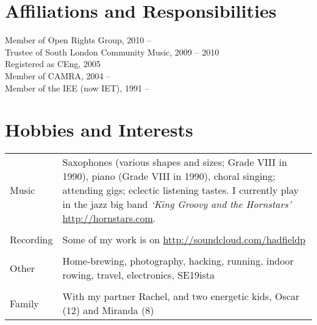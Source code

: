 \documentclass[line]{resume}
\begin{document}
\begin{resume}
    \section{\mysidestyle Affiliations and Responsibilities}

    Member of Open Rights Group, 2010 --                                                              \vspace{0.5mm}\\%
    Trustee of South London Community Music, 2009 -- 2010                                             \vspace{0.5mm}\\%
    Registered as CEng, 2005                                                                          \vspace{0.5mm}\\%
    Member of CAMRA, 2004 --                                                                          \vspace{0.5mm}\\%
    Member of the IEE (now IET), 1991 --

    \section{\mysidestyle Hobbies and Interests}
    \vspace{1.5mm}
    \begin{table}[ht]
        \begin{tabular}{p{2cm} p{12cm}}
        {Music}&{Saxophones (various shapes and sizes; Grade VIII in 1990), piano (Grade VIII in 1990), choral singing;
                 attending gigs; eclectic listening tastes. I currently play in the jazz big band \textsl{`King Groovy
                 and the Hornstars'} \url{http://hornstars.com}. }\\                                  \vspace{0.5mm}\\%
        {Recording}&{Some of my work is on \url{http://soundcloud.com/hadfieldp}}\\
                                                                                                      \vspace{0.5mm}\\%
        {Other}&{Home-brewing, photography, hacking, running, indoor rowing, travel, electronics,
		 SE19ista}\\                                                                          \vspace{0.5mm}\\%
        {Family}&{With my partner Rachel, and two energetic kids, Oscar (12) and Miranda (8)}\\
        \end{tabular}
    \end{table}

\end{resume}
\end{document}
